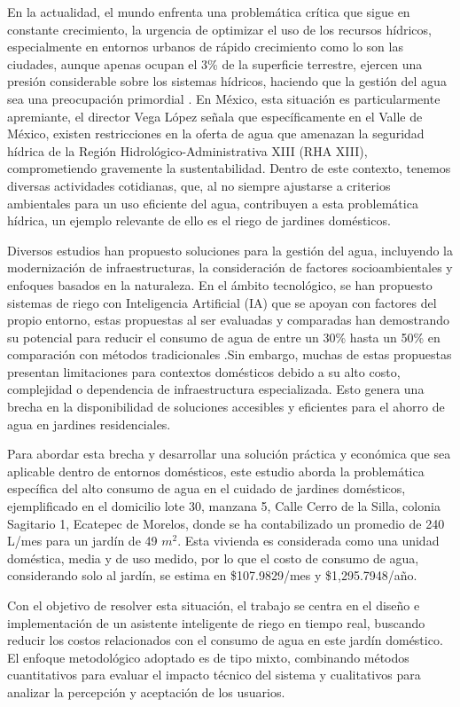 \documentclass[pdflatex,sn-mathphys-num]{sn-jnl}%
\theoremstyle{thmstyleone}%
\theoremstyle{thmstyletwo}%
\theoremstyle{thmstylethree}%
\begin{document}
\begin{multicols}{2}
\justifying
En la actualidad, el mundo enfrenta una problemática crítica que sigue en constante crecimiento, la urgencia de optimizar el uso de los recursos hídricos, especialmente en entornos urbanos de rápido crecimiento como lo son las ciudades, aunque apenas ocupan el 3\% de la superficie terrestre, ejercen una presión considerable sobre los sistemas hídricos, haciendo que la gestión del agua sea una preocupación primordial \cite{ref1}. En México, esta situación es particularmente apremiante, el director Vega López señala que específicamente en el Valle de México, existen restricciones en la oferta de agua que amenazan la seguridad hídrica de la Región Hidrológico-Administrativa XIII (RHA XIII), comprometiendo gravemente la sustentabilidad\cite{ref2}. Dentro de este contexto, tenemos diversas actividades cotidianas, que, al no siempre ajustarse a criterios ambientales para un uso eficiente del agua, contribuyen a esta problemática hídrica, un ejemplo relevante de ello es el riego de jardines domésticos.

Diversos estudios han propuesto soluciones para la gestión del agua, incluyendo la modernización de infraestructuras, la consideración de factores socioambientales y enfoques basados en la naturaleza. En el ámbito tecnológico, se han propuesto sistemas de riego con Inteligencia Artificial (IA) que se apoyan con factores del propio entorno, estas propuestas al ser evaluadas y comparadas han demostrando su potencial para reducir el consumo de agua de entre un 30\% hasta un 50\% en comparación con métodos tradicionales \cite{ref3}.Sin embargo, muchas de estas propuestas presentan limitaciones para contextos domésticos debido a su alto costo, complejidad o dependencia de infraestructura especializada. Esto genera una brecha en la disponibilidad de soluciones accesibles y eficientes para el ahorro de agua en jardines residenciales.

Para abordar esta brecha y desarrollar una solución práctica y económica que sea aplicable dentro de entornos domésticos, este estudio aborda la problemática específica del alto consumo de agua en el cuidado de jardines domésticos, ejemplificado en el domicilio lote 30, manzana 5, Calle Cerro de la Silla, colonia Sagitario 1, Ecatepec de Morelos, donde se ha contabilizado un promedio de 240 L/mes para un jardín de 49 $m^2$. Esta vivienda es considerada como una unidad doméstica, media y de uso medido, por lo que el costo de consumo de agua, considerando solo al jardín, se estima en \$107.9829/mes y \$1,295.7948/año\cite{ref4}.

Con el objetivo de resolver esta situación, el trabajo se centra en el diseño e implementación de un asistente inteligente de riego en tiempo real, buscando reducir los costos relacionados con el consumo de agua en este jardín doméstico. El enfoque metodológico adoptado es de tipo mixto, combinando métodos cuantitativos para evaluar el impacto técnico del sistema y cualitativos para analizar la percepción y aceptación de los usuarios.
\end{multicols}
\end{document}
